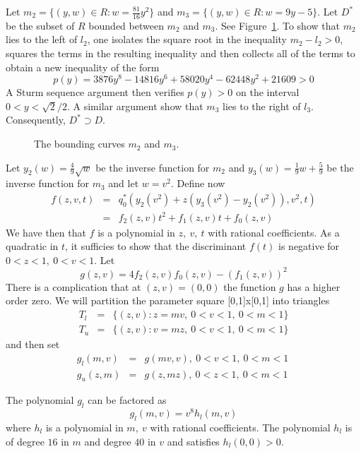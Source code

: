 \documentclass[12pt]{icgft}
\theoremstyle{definition}
\numberwithin{equation}{section}
\begin{document}
Let $m_2 = \{ (y,w) \in R : w = \frac{81}{16}y^2 \}$ and $m_3 = \{ (y,w) \in R : w = 9y-5 \}$.  Let $D^*$ be the subset of $R$ bounded between $m_2$ and $m_3$.
See Figure~\ref{F:pspace2}. To show that $m_2$ lies to the left of $l_2$, one isolates the square root in the inequality $m_2 - l_2 > 0$, squares the terms in the resulting inequality and then collects all of the terms to obtain a new inequality of the form
$$p(y) = 3876y^8 -14816y^6+58020y^4-62448y^2+21609 > 0$$
\noindent A Sturm sequence argument then verifies $p(y) > 0$ on the interval $0 < y < \sqrt{2} /2$.  A similar argument show that $m_3$ lies to the right of $l_3$.  Consequently, $D^* \supset D$.

\begin{figure}
\begin{center}
\caption{The bounding curves $m_2$ and $m_3$.}
\label{F:pspace2}
\end{center}
\end{figure}

Let $y_2(w) = \frac{4}{9}\sqrt{w}$ be the inverse function for $m_2$ and $y_3(w) =\frac{1}{9}w + \frac{5}{9}$ be the inverse function for $m_3$ and let $w=v^2$. Define now
\begin{eqnarray*}
f(z,v,t) &=& q_0^*(y_2(v^2) + z(y_3(v^2)-y_2(v^2)),v^2,t) \\
         &=& f_2(z,v)t^2 + f_1(z,v)t + f_0(z,v)
\end{eqnarray*}
\noindent We have then that $f$ is a polynomial in $z,\  v,\  t$ with rational coefficients.  As a quadratic in $t$, it sufficies to show that the discriminant $f(t)$ is negative for $0 < z < 1, \ 0 < v < 1$.  Let
$$g(z,v) = 4f_2(z,v)f_0(z,v) - (f_1(z,v))^2$$
\noindent There is a complication that at $(z,v) = (0,0)$ the function $g$ has a higher order zero.  We will partition the parameter square [0,1]x[0,1] into triangles
\begin{eqnarray*}
T_l &=& \{ (z,v) : z = mv, \  0 < v < 1, \  0 < m < 1 \} \\
T_u &=& \{ (z,v) : v = mz, \  0 < v < 1, \  0 < m < 1 \}
\end{eqnarray*}
\noindent and then set
\begin{eqnarray*}
g_l(m,v) &=& g(mv,v),\    0 < v < 1, \  0 < m < 1 \ \\
g_u(z,m) &=& g(z,mz),\    0 < z < 1, \  0 < m < 1 \
\end{eqnarray*}

The polynomial $g_l$ can be factored as
$$g_l(m,v) = v^8 h_l(m,v)$$
\noindent where $h_l$ is a polynomial in $m,\  v$ with rational coefficients.  The polynomial $h_l$ is of degree $16$ in $m$ and degree $40$ in $v$ and satisfies $h_l(0,0) > 0$.
\end{document}
